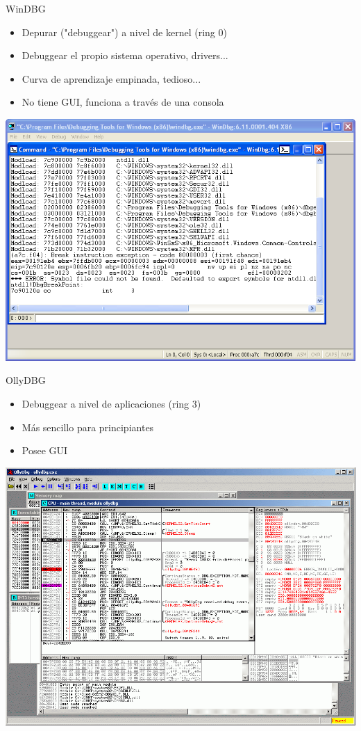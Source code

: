 \documentclass{beamer}
\begin{document}
\begin{frame}{WinDBG}

\begin{itemize}
\item Depurar ("debuggear") a nivel de kernel (ring 0)
\item Debuggear el propio sistema operativo, drivers...
\item Curva de aprendizaje empinada, tedioso...
\item No tiene GUI, funciona a través de una consola
\end{itemize}
\begin{center}
\includegraphics[scale=0.21]{windbg.png}
\end{center}

\end{frame}

\begin{frame}{OllyDBG}

\begin{itemize}
	\item Debuggear a nivel de aplicaciones (ring 3)
	\item Más sencillo para principiantes
	\item Posee GUI
\end{itemize}
\begin{center}
\includegraphics[scale=0.25]{OllyDbg2.png}
\end{center}
\end{frame}
\end{document}
